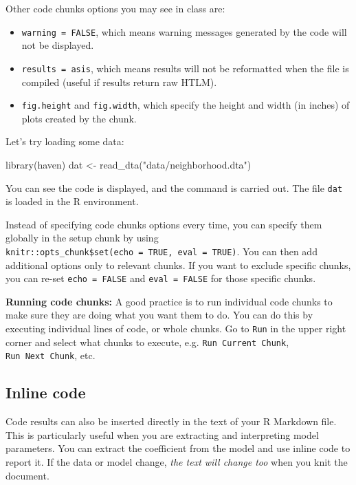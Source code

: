 \documentclass[
  letterpaper,
  DIV=11,
  numbers=noendperiod]{scrreprt}
\newenvironment{Shaded}{\begin{snugshade}}{\end{snugshade}}
\newcommand{\FunctionTok}[1]{\textcolor[rgb]{0.02,0.16,0.49}{#1}}
\newcommand{\NormalTok}[1]{\textcolor[rgb]{0.00,0.44,0.13}{#1}}
\newcommand{\OtherTok}[1]{\textcolor[rgb]{0.00,0.44,0.13}{#1}}
\newcommand{\StringTok}[1]{\textcolor[rgb]{0.25,0.44,0.63}{#1}}
\providecommand{\tightlist}{%
  \setlength{\itemsep}{0pt}\setlength{\parskip}{0pt}}\usepackage{longtable,booktabs,array}
\begin{document}
Other code chunks options you may see in class are:

\begin{itemize}
\tightlist
\item
  \texttt{warning\ =\ FALSE}, which means warning messages generated by
  the code will not be displayed.
\item
  \texttt{results\ =\ \textquotesingle{}asis\textquotesingle{}}, which
  means results will not be reformatted when the file is compiled
  (useful if results return raw HTLM).
\item
  \texttt{fig.height} and \texttt{fig.width}, which specify the height
  and width (in inches) of plots created by the chunk.
\end{itemize}

Let's try loading some data:

\begin{Shaded}
\begin{Highlighting}[]
\FunctionTok{library}\NormalTok{(haven)}
\NormalTok{dat }\OtherTok{\textless{}{-}} \FunctionTok{read\_dta}\NormalTok{(}\StringTok{"data/neighborhood.dta"}\NormalTok{)}
\end{Highlighting}
\end{Shaded}

You can see the code is displayed, and the command is carried out. The
file \texttt{dat} is loaded in the R environment.

Instead of specifying code chunks options every time, you can specify
them globally in the setup chunk by using
\texttt{knitr::opts\_chunk\$set(echo\ =\ TRUE,\ eval\ =\ TRUE)}. You can
then add additional options only to relevant chunks. If you want to
exclude specific chunks, you can re-set \texttt{echo\ =\ FALSE} and
\texttt{eval\ =\ FALSE} for those specific chunks.

\textbf{Running code chunks:} A good practice is to run individual code
chunks to make sure they are doing what you want them to do. You can do
this by executing individual lines of code, or whole chunks. Go to
\texttt{Run} in the upper right corner and select what chunks to
execute, e.g. \texttt{Run\ Current\ Chunk}, \texttt{Run\ Next\ Chunk},
etc.

\hypertarget{inline-code}{%
\subsection{Inline code}\label{inline-code}}

Code results can also be inserted directly in the text of your R
Markdown file. This is particularly useful when you are extracting and
interpreting model parameters. You can extract the coefficient from the
model and use inline code to report it. If the data or model change,
\emph{the text will change too} when you knit the document.
\end{document}
